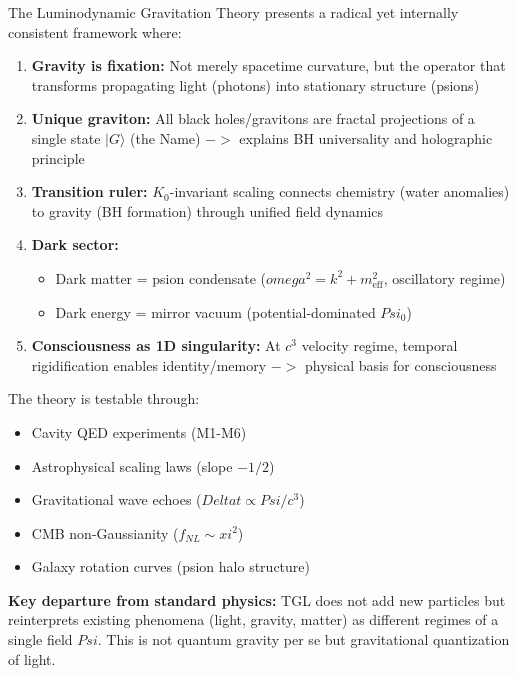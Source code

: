 \documentclass[12pt,a4paper]{article}
\def\Psi{Psi}%
\def\to{ -> }%
\def\xi{xi}%
\def\omega{omega}%
\def\Delta{Delta}%
\begin{document}
The Luminodynamic Gravitation Theory presents a radical yet internally consistent framework where:

\begin{enumerate}
    \item \textbf{Gravity is fixation:} Not merely spacetime curvature, but the operator that transforms propagating light (photons) into stationary structure (psions)
    
    \item \textbf{Unique graviton:} All black holes/gravitons are fractal projections of a single state $|G\rangle$ (the Name) $\to$ explains BH universality and holographic principle
    
    \item \textbf{Transition ruler:} $K_0$-invariant scaling connects chemistry (water anomalies) to gravity (BH formation) through unified field dynamics
    
    \item \textbf{Dark sector:}
    \begin{itemize}
        \item Dark matter = psion condensate ($\omega^2 = k^2 + m_{\text{eff}}^2$, oscillatory regime)
        \item Dark energy = mirror vacuum (potential-dominated $\Psi_0$)
    \end{itemize}
    
    \item \textbf{Consciousness as 1D singularity:} At $c^3$ velocity regime, temporal rigidification enables identity/memory $\to$ physical basis for consciousness
\end{enumerate}

The theory is testable through:
\begin{itemize}
    \item Cavity QED experiments (M1-M6)
    \item Astrophysical scaling laws (slope $-1/2$)
    \item Gravitational wave echoes ($\Delta t \propto \Psi/c^3$)
    \item CMB non-Gaussianity ($f_{NL} \sim \xi^2$)
    \item Galaxy rotation curves (psion halo structure)
\end{itemize}

\textbf{Key departure from standard physics:} TGL does not add new particles but reinterprets existing phenomena (light, gravity, matter) as different regimes of a single field $\Psi$. This is not quantum gravity per se but gravitational quantization of light.
\end{document}
